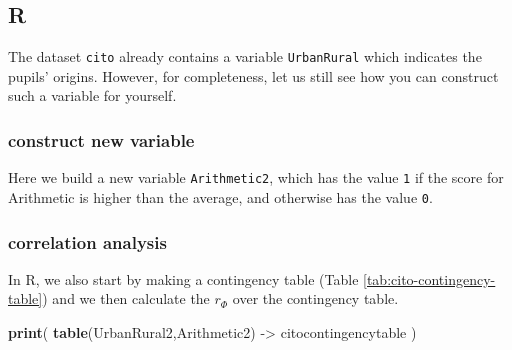 \documentclass[
]{book}
\newenvironment{Shaded}{\begin{snugshade}}{\end{snugshade}}
\newcommand{\CommentTok}[1]{\textcolor[rgb]{0.56,0.35,0.01}{\textit{#1}}}
\newcommand{\DecValTok}[1]{\textcolor[rgb]{0.00,0.00,0.81}{#1}}
\newcommand{\KeywordTok}[1]{\textcolor[rgb]{0.13,0.29,0.53}{\textbf{#1}}}
\newcommand{\NormalTok}[1]{#1}
\newcommand{\OperatorTok}[1]{\textcolor[rgb]{0.81,0.36,0.00}{\textbf{#1}}}
\newcommand{\StringTok}[1]{\textcolor[rgb]{0.31,0.60,0.02}{#1}}
\begin{document}
\hypertarget{r-9}{%
\subsection{R}\label{r-9}}

The dataset \texttt{cito} already contains a variable \texttt{UrbanRural} which indicates the pupils' origins.
However, for completeness, let us still see how you can construct such a variable for yourself.

\hypertarget{construct-new-variable-2}{%
\subsubsection{construct new variable}\label{construct-new-variable-2}}

\begin{Shaded}
\end{Shaded}

Here we build a new variable \texttt{Arithmetic2}, which has the value \texttt{1} if the score for
Arithmetic is higher than the average, and otherwise has the value \texttt{0}.

\hypertarget{correlation-analysis-2}{%
\subsubsection{correlation analysis}\label{correlation-analysis-2}}

In R, we also start by making a contingency table (Table \ref{tab:cito-contingency-table}) and we then calculate the \(r_\Phi\) over the contingency table.

\begin{Shaded}
\begin{Highlighting}[]
\KeywordTok{print}\NormalTok{( }\KeywordTok{table}\NormalTok{(UrbanRural2,Arithmetic2) {-}\textgreater{}}\StringTok{ }\NormalTok{citocontingencytable ) }
\end{Highlighting}
\end{Shaded}
\end{document}
